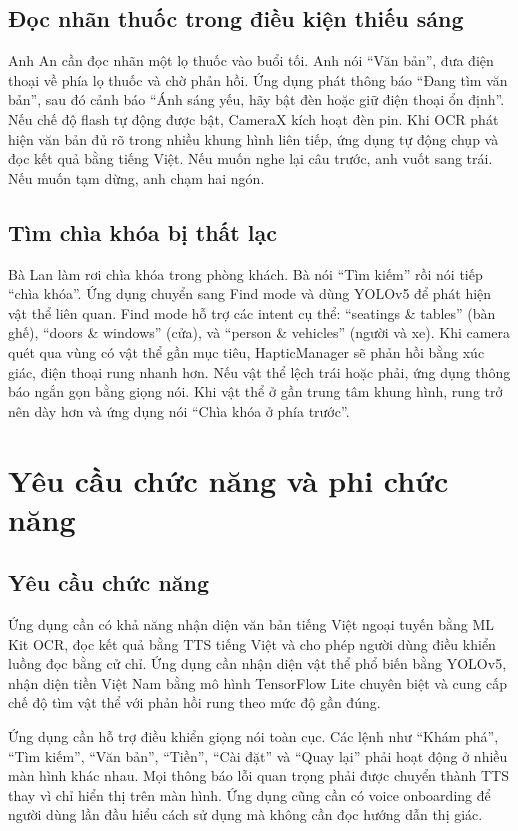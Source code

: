 \documentclass[a4paper,13pt]{report}
\begin{document}
\subsection{Đọc nhãn thuốc trong điều kiện thiếu sáng}

Anh An cần đọc nhãn một lọ thuốc vào buổi tối. Anh nói ``Văn bản'', đưa điện thoại về phía lọ thuốc và chờ phản hồi. Ứng dụng phát thông báo ``Đang tìm văn bản'', sau đó cảnh báo ``Ánh sáng yếu, hãy bật đèn hoặc giữ điện thoại ổn định''. Nếu chế độ flash tự động được bật, CameraX kích hoạt đèn pin. Khi OCR phát hiện văn bản đủ rõ trong nhiều khung hình liên tiếp, ứng dụng tự động chụp và đọc kết quả bằng tiếng Việt. Nếu muốn nghe lại câu trước, anh vuốt sang trái. Nếu muốn tạm dừng, anh chạm hai ngón.

\subsection{Tìm chìa khóa bị thất lạc}

Bà Lan làm rơi chìa khóa trong phòng khách. Bà nói ``Tìm kiếm'' rồi nói tiếp ``chìa khóa''. Ứng dụng chuyển sang Find mode và dùng YOLOv5 để phát hiện vật thể liên quan. Find mode hỗ trợ các intent cụ thể: ``seatings \& tables'' (bàn ghế), ``doors \& windows'' (cửa), và ``person \& vehicles'' (người và xe). Khi camera quét qua vùng có vật thể gần mục tiêu, HapticManager sẽ phản hồi bằng xúc giác, điện thoại rung nhanh hơn. Nếu vật thể lệch trái hoặc phải, ứng dụng thông báo ngắn gọn bằng giọng nói. Khi vật thể ở gần trung tâm khung hình, rung trở nên dày hơn và ứng dụng nói ``Chìa khóa ở phía trước''.

\section{Yêu cầu chức năng và phi chức năng}

\subsection{Yêu cầu chức năng}

Ứng dụng cần có khả năng nhận diện văn bản tiếng Việt ngoại tuyến bằng ML Kit OCR, đọc kết quả bằng TTS tiếng Việt và cho phép người dùng điều khiển luồng đọc bằng cử chỉ. Ứng dụng cần nhận diện vật thể phổ biến bằng YOLOv5, nhận diện tiền Việt Nam bằng mô hình TensorFlow Lite chuyên biệt và cung cấp chế độ tìm vật thể với phản hồi rung theo mức độ gần đúng.

Ứng dụng cần hỗ trợ điều khiển giọng nói toàn cục. Các lệnh như ``Khám phá'', ``Tìm kiếm'', ``Văn bản'', ``Tiền'', ``Cài đặt'' và ``Quay lại'' phải hoạt động ở nhiều màn hình khác nhau. Mọi thông báo lỗi quan trọng phải được chuyển thành TTS thay vì chỉ hiển thị trên màn hình. Ứng dụng cũng cần có voice onboarding để người dùng lần đầu hiểu cách sử dụng mà không cần đọc hướng dẫn thị giác.
\end{document}
